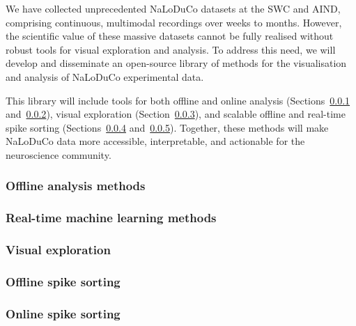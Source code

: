 We have collected unprecedented NaLoDuCo datasets at the SWC and AIND,
comprising continuous, multimodal recordings over weeks to months. However, the
scientific value of these massive datasets cannot be fully realised without
robust tools for visual exploration and analysis. To address this need, we will
develop and disseminate an open-source library of methods for the visualisation
and analysis of NaLoDuCo experimental data.

This library will include tools for both offline and online analysis
(Sections~\ref{sec:offlineAnalysisMethods}
and~\ref{sec:rtmlMethods}), visual exploration
(Section~\ref{sec:visualExploration}), and scalable offline and real-time spike
sorting (Sections~\ref{sec:offlineSpikeSorting}
and~\ref{sec:onlineSpikeSorting}). Together, these methods will make NaLoDuCo
data more accessible, interpretable, and actionable for the neuroscience
community.

\subsubsection{Offline analysis methods}
\label{sec:offlineAnalysisMethods}



\subsubsection{Real-time machine learning methods}
\label{sec:rtmlMethods}



\subsubsection{Visual exploration}
\label{sec:visualExploration}



\subsubsection{Offline spike sorting}
\label{sec:offlineSpikeSorting}



\subsubsection{Online spike sorting}
\label{sec:onlineSpikeSorting}


